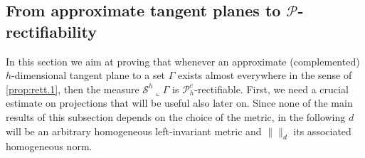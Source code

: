 \documentclass[10pt, a4paper,
oneside, headinclude,footinclude]{scrartcl}
\begin{document}

\subsection{From approximate tangent planes to $\mathscr{P}$-rectifiability}

In this section we aim at proving that whenever an approximate (complemented) $h$-dimensional tangent plane to a set $\Gamma$ exists almost everywhere in the sense of \cref{prop:rett.1}, then the measure $\mathcal{S}^h\llcorner\Gamma$ is $\mathscr{P}^c_h$-rectifiable. First, we need a crucial estimate on projections that will be useful also later on. Since none of the main results of this subsection depends on the choice of the metric, in the following $d$ will be an arbitrary homogeneous left-invariant metric and $\lVert\rVert_{d}$ its associated homogeneous norm.
\end{document}
